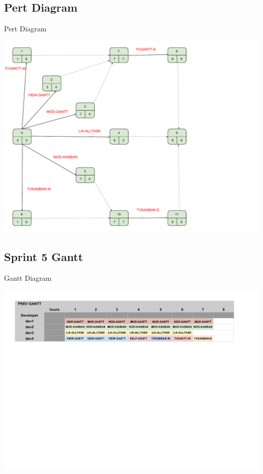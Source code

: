 \documentclass{beamer}
\begin{document}
\subsection{Pert Diagram}

\begin{frame}{Pert Diagram}
	\begin{center}
       \includegraphics[scale=0.32]{Pert5.pdf}
        \end{center}
\end{frame}


\subsection{Sprint 5 Gantt}

\begin{frame}{Gantt Diagram}
	\begin{center}
        \includegraphics[scale=0.412]{Gantt5.pdf}
        \end{center}
\end{frame}
\end{document}
